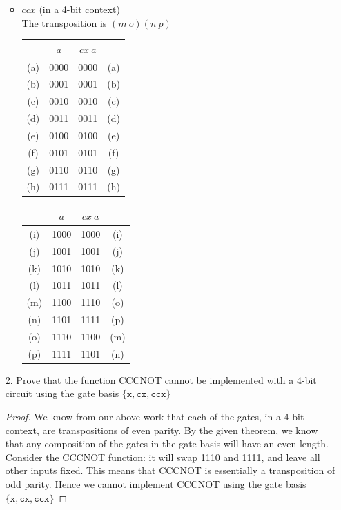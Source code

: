 \documentclass[11pt]{article}
\begin{document}
\begin{enumerate}
\begin{itemize}
\begin{tabular}{c|c|c|c}
	\end{tabular}

	\vspace{0.3in}

	\item $ccx$ (in a 4-bit context) \\
	The transposition is $(m\ o) (n\ p)$ 

	\begin{tabular}{c|c|c|c}
	$\_$ & $a$ & $cx\ a$ & $\_$ \\
\hline (a) &  0000 &  0000 & (a) \\ 
\hline (b) &  0001 &  0001 & (b) \\ 
\hline (c) &  0010 &  0010 & (c) \\ 
\hline (d) &  0011 &  0011 & (d) \\ 
\hline (e) &  0100 &  0100 & (e) \\ 
\hline (f) &  0101 &  0101 & (f) \\ 
\hline (g) &  0110 &  0110 & (g) \\ 
\hline (h) &  0111 &  0111 & (h) \\ 


	\end{tabular}
	\quad
	\begin{tabular}{c|c|c|c}
	$\_$ & $a$ & $cx\ a$ & $\_$ \\
\hline (i) &  1000 &  1000 & (i) \\ 
\hline (j) &  1001 &  1001 & (j) \\ 
\hline (k) &  1010 &  1010 & (k) \\ 
\hline (l) &  1011 &  1011 & (l) \\ 
\hline (m) &  1100 &  1110 & (o) \\ 
\hline (n) &  1101 &  1111 & (p) \\ 
\hline (o) &  1110 &  1100 & (m) \\ 
\hline (p) &  1111 &  1101 & (n) \\ 

	\end{tabular}
	\end{itemize}

	\newpage
\item[2.] Prove that the function CCCNOT cannot be implemented with a 4-bit circuit using the gate basis $\{\texttt{x}, \texttt{cx}, \texttt{ccx} \}$
\begin{proof}
	We know from our above work that each of the gates, in a 4-bit context, are transpositions of even parity. 
	By the given theorem, we know that any composition of the gates in the gate basis will have an even length. 
	Consider the CCCNOT function: it will swap 1110 and 1111, and leave all other inputs fixed. This means that CCCNOT is essentially a transposition of odd parity. 
	Hence we cannot implement CCCNOT using the gate basis 
	$\{\texttt{x}, \texttt{cx}, \texttt{ccx} \}$
\end{proof}



\end{enumerate}
\end{document}
